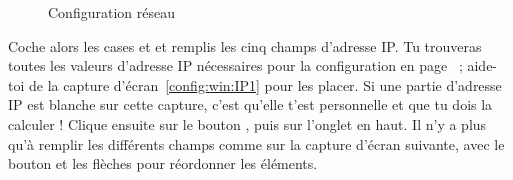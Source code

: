 \noindent
  \begin{figure}[!h]
    \begin{center}  
             \caption{Configuration r\'eseau}
    \end{center}
  \end{figure}



Coche alors les cases  et  et remplis les cinq champs d'adresse IP. Tu trouveras toutes les valeurs d'adresse IP n\'ecessaires pour la configuration en page~\pageref{tableau:mon_IP} ; aide-toi de la capture d'\'ecran~\ref{config:win:IP1} pour les placer. Si une partie d'adresse IP est blanche sur cette capture, c'est qu'elle t'est personnelle et que tu dois la calculer !
Clique ensuite sur le bouton , puis sur l'onglet
 en haut.
Il n'y a plus qu'\`a  remplir les diff\'erents champs comme sur la
capture d'\'ecran suivante, avec le bouton  et les
fl\`eches pour r\'eordonner les \'el\'ements.


